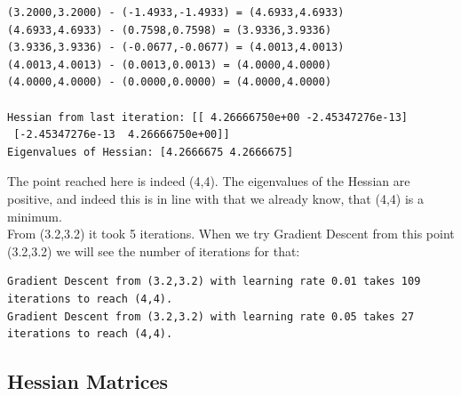 \documentclass[journal]{IEEEtran}
\begin{document}
{\footnotesize
\begin{verbatim}
(3.2000,3.2000) - (-1.4933,-1.4933) = (4.6933,4.6933)
(4.6933,4.6933) - (0.7598,0.7598) = (3.9336,3.9336)
(3.9336,3.9336) - (-0.0677,-0.0677) = (4.0013,4.0013)
(4.0013,4.0013) - (0.0013,0.0013) = (4.0000,4.0000)
(4.0000,4.0000) - (0.0000,0.0000) = (4.0000,4.0000)

Hessian from last iteration: [[ 4.26666750e+00 -2.45347276e-13]
 [-2.45347276e-13  4.26666750e+00]]
Eigenvalues of Hessian: [4.2666675 4.2666675]
\end{verbatim}
}
The point reached here is indeed (4,4). The eigenvalues of the Hessian are positive, and indeed this is in line with that we already know,
that (4,4) is a minimum.\\
From (3.2,3.2) it took 5 iterations. When we try Gradient Descent from this point (3.2,3.2) we will see the number of iterations for that:
{\footnotesize
\begin{verbatim}
Gradient Descent from (3.2,3.2) with learning rate 0.01 takes 109 iterations to reach (4,4).
Gradient Descent from (3.2,3.2) with learning rate 0.05 takes 27 iterations to reach (4,4).
\end{verbatim}
}



\subsection{Hessian Matrices}
\label{HessianMatrices}





\printbibliography


\end{document}
